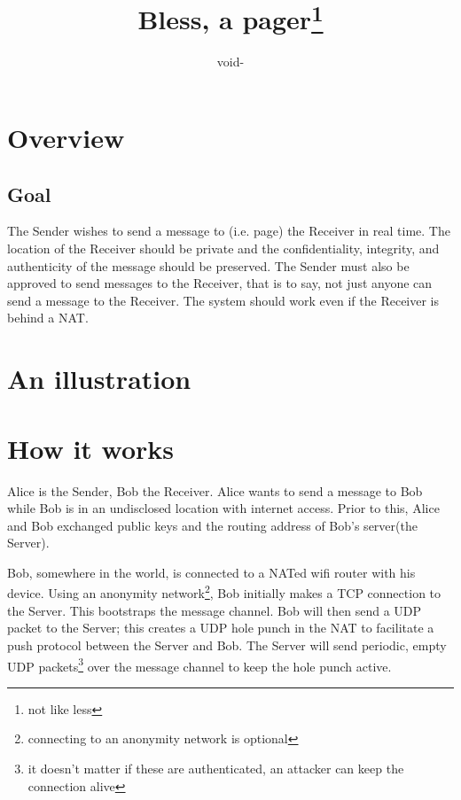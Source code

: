 \documentclass[11pt]{article}
\title{Bless, a pager\footnote{not like less}}
\author{void-}
\begin{document}
\maketitle
\section*{Overview}
\subsection*{Goal}
The Sender wishes to send a message to (i.e. page) the Receiver in real time.
The location of the Receiver should be private and the confidentiality,
integrity, and authenticity of the message should be preserved. The Sender must
also be approved to send messages to the Receiver, that is to say, not just
anyone can send a message to the Receiver. The system should work even if the
Receiver is behind a NAT.

\section*{An illustration}

\section*{How it works}
Alice is the Sender, Bob the Receiver. Alice wants to send a message to Bob
while Bob is in an undisclosed location with internet access. Prior to this,
Alice and Bob exchanged public keys and the routing address of Bob's server(the
Server).

Bob, somewhere in the world, is connected to a NATed wifi router with his
device. Using an anonymity network\footnote{connecting to an anonymity network
is optional}, Bob initially makes a TCP connection to the Server. This
bootstraps the message channel. Bob will then send a UDP packet to the Server;
this creates a UDP hole punch in the NAT to facilitate a push protocol between
the Server and Bob. The Server will send periodic, empty UDP
packets\footnote{it doesn't matter if these are authenticated, an attacker can
keep the connection alive} over the message channel to keep the hole punch
active.
\end{document}
